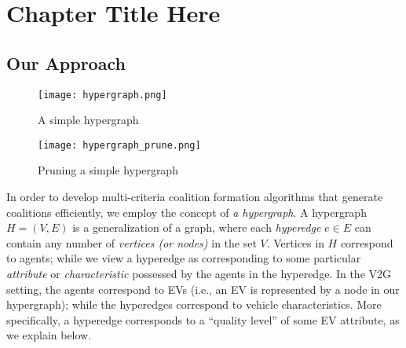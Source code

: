
\chapter{Chapter Title Here} %

\label{Chapter1} %






\section{Our Approach}\label{sec:approach}



\begin{figure}
	\centering
	\begin{minipage}{.5\textwidth}
		\centering
		\texttt{[image: hypergraph.png]}
		\caption{A simple hypergraph\label{fig:hypergraph}}
	\end{minipage}%
	\begin{minipage}{.5\textwidth}
		\texttt{[image: hypergraph\_prune.png]}
		\caption{Pruning a simple hypergraph\label{fig:hypergraph_prune}}
	\end{minipage}
\end{figure}

In order to develop multi-criteria coalition formation algorithms that generate coalitions efficiently, we employ the concept of {\em a hypergraph}.
A hypergraph $H = (V, E)$ is a generalization of a graph, where each {\em hyperedge} $e \in E$ can contain any number of {\em vertices (or nodes)} in the set $V$.
Vertices in $H$ correspond to agents; while we view a hyperedge as corresponding to some particular {\em attribute} or {\em characteristic} possessed by the agents in the hyperedge.
In the V2G setting, the agents correspond to EVs (i.e., an EV is represented by a node in our hypergraph); while the hyperedges correspond to vehicle characteristics. More specifically, a hyperedge corresponds to a ``quality level'' of some EV attribute, as we explain below.

